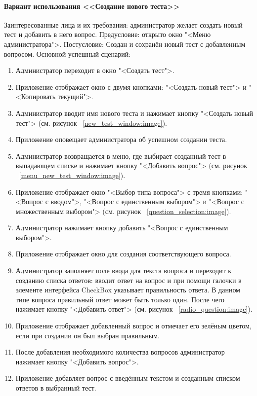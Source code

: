 \paragraph{Вариант использования <<Создание нового теста>>}

Заинтересованные лица и их требования: администратор желает создать новый тест и добавить в него вопрос.
\newline Предусловие: открыто окно "<Меню администратора">.
\newline Постусловие: Создан и сохранён новый тест с добавленным вопросом.
\newline Основной успешный сценарий:
\begin{enumerate}
	\item Администратор переходит в окно "<Создать тест">.
	\item Приложение отображает окно с двумя кнопками: "<Создать новый тест"> и "<Копировать текущий">.
	\item Администратор вводит имя нового теста и нажимает кнопку "<Создать новый тест"> (см. рисунок ~\ref{new_test_window:image}).
	\item Приложение оповещает администратора об успешном создании теста. 
	\item Администратор возвращается в меню, где выбирает созданный тест в выпадающем списке и нажимает кнопку "<Добавить вопрос"> (см. рисунок ~\ref{menu_new_test_window:image}).
	\item Приложение отображает окно "<Выбор типа вопроса"> с тремя кнопками: "<Вопрос с вводом">, "<Вопрос с единственным выбором"> и "<Вопрос с множественным выбором"> (см. рисунок ~\ref{question_selection:image}).
	\item Администратор нажимает кнопку добавить "<Вопрос с единственным выбором">.
	\item Приложение отображает окно для создания соответствующего вопроса.
	\item Администратор заполняет поле ввода для текста вопроса и переходит к созданию списка ответов: вводит ответ на вопрос и при помощи галочки в элементе интерфейса CheckBox указывает правильность ответа. В данном типе вопроса правильный ответ может быть только один. После чего нажимает кнопку "<Добавить ответ"> (см. рисунок ~\ref{radio_question:image}).
	\item Приложение отображает добавленный вопрос и отмечает его зелёным цветом, если при создании он был выбран правильным.
	\item После добавления необходимого количества вопросов администратор нажимает кнопку "<Добавить вопрос">.
	\item Приложение добавляет вопрос с введённым текстом и созданным списком ответов в выбранный тест.
\end{enumerate}

